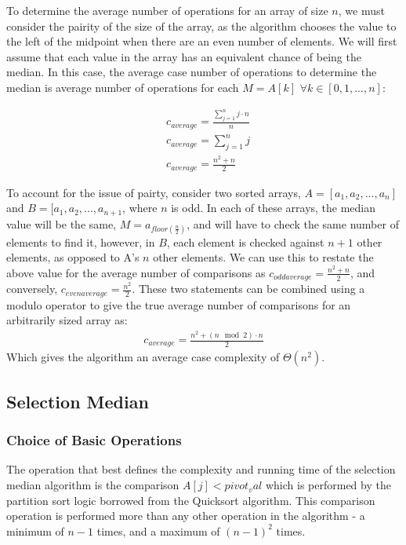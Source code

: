 \documentclass{article}
\begin{document}
            To determine the average number of operations for an array of size $n$, we must consider the pairity of the size of the array, as the algorithm chooses the value to the left of the midpoint when there are an even number of elements. We will first assume that each value in the array has an equivalent chance of being the median. In this case, the average case number of operations to determine the median is average number of operations for each $M = A[k]$ $\forall k \in [0, 1, ..., n]$:

            \begin{align}
                & c_{average} = \frac{\sum_{j = 1}^{n} j \cdot n}{n} \\
                & c_{average} = \sum_{j = 1}^n j\\
                & c_{average} = \frac{n^2 + n}{2}
            \end{align}

            To account for the issue of pairty, consider two sorted arrays, $A = [a_1, a_2, ..., a_n]$ and $B = [a_1, a_2, ..., a_{n+1}$, where $n$ is odd. In each of these arrays, the median value will be the same, $M = a_{floor(\frac{n}{2})}$, and will have to check the same number of elements to find it, however, in $B$, each element is checked against $n + 1$ other elements, as opposed to A's $n$ other elements. We can use this to restate the above value for the average number of comparisons as $c_{odd average} = \frac{n^2 + n}{2}$, and conversely, $c_{even average} = \frac{n^2}{2}$. These two statements can be combined using a modulo operator to give the true average number of comparisons for an arbitrarily sized array as:
            \begin{align}
                c_{average} = \frac{n^2 + (n\mod 2) \cdot n}{2}
            \end{align}
            Which gives the algorithm an average case complexity of $\Theta(n^2)$.
    \subsection{Selection Median}
        \subsubsection{Choice of Basic Operations}
            The operation that best defines the complexity and running time of the selection median algorithm is the comparison $A[j] < pivot_val$ which is performed by the partition sort logic borrowed from the Quicksort algorithm. This comparison operation is performed more than any other operation in the algorithm - a minimum of $n - 1$ times, and a maximum of $(n - 1)^2$ times.
\end{document}
